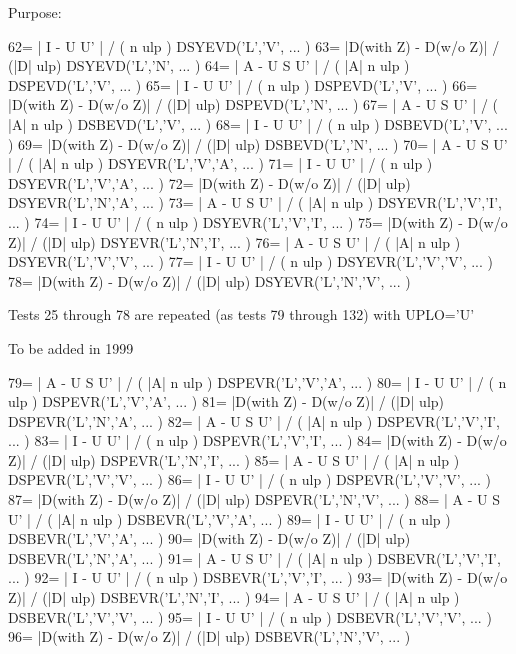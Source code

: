 \begin{DoxyParagraph}{Purpose\+: }
\begin{DoxyVerb}
    62= | I - U U' | / ( n ulp )              DSYEVD('L','V', ... )
    63= |D(with Z) - D(w/o Z)| / (|D| ulp)    DSYEVD('L','N', ... )
    64= | A - U S U' | / ( |A| n ulp )        DSPEVD('L','V', ... )
    65= | I - U U' | / ( n ulp )              DSPEVD('L','V', ... )
    66= |D(with Z) - D(w/o Z)| / (|D| ulp)    DSPEVD('L','N', ... )
    67= | A - U S U' | / ( |A| n ulp )        DSBEVD('L','V', ... )
    68= | I - U U' | / ( n ulp )              DSBEVD('L','V', ... )
    69= |D(with Z) - D(w/o Z)| / (|D| ulp)    DSBEVD('L','N', ... )
    70= | A - U S U' | / ( |A| n ulp )        DSYEVR('L','V','A', ... )
    71= | I - U U' | / ( n ulp )              DSYEVR('L','V','A', ... )
    72= |D(with Z) - D(w/o Z)| / (|D| ulp)    DSYEVR('L','N','A', ... )
    73= | A - U S U' | / ( |A| n ulp )        DSYEVR('L','V','I', ... )
    74= | I - U U' | / ( n ulp )              DSYEVR('L','V','I', ... )
    75= |D(with Z) - D(w/o Z)| / (|D| ulp)    DSYEVR('L','N','I', ... )
    76= | A - U S U' | / ( |A| n ulp )        DSYEVR('L','V','V', ... )
    77= | I - U U' | / ( n ulp )              DSYEVR('L','V','V', ... )
    78= |D(with Z) - D(w/o Z)| / (|D| ulp)    DSYEVR('L','N','V', ... )

    Tests 25 through 78 are repeated (as tests 79 through 132)
    with UPLO='U'

    To be added in 1999

    79= | A - U S U' | / ( |A| n ulp )        DSPEVR('L','V','A', ... )
    80= | I - U U' | / ( n ulp )              DSPEVR('L','V','A', ... )
    81= |D(with Z) - D(w/o Z)| / (|D| ulp)    DSPEVR('L','N','A', ... )
    82= | A - U S U' | / ( |A| n ulp )        DSPEVR('L','V','I', ... )
    83= | I - U U' | / ( n ulp )              DSPEVR('L','V','I', ... )
    84= |D(with Z) - D(w/o Z)| / (|D| ulp)    DSPEVR('L','N','I', ... )
    85= | A - U S U' | / ( |A| n ulp )        DSPEVR('L','V','V', ... )
    86= | I - U U' | / ( n ulp )              DSPEVR('L','V','V', ... )
    87= |D(with Z) - D(w/o Z)| / (|D| ulp)    DSPEVR('L','N','V', ... )
    88= | A - U S U' | / ( |A| n ulp )        DSBEVR('L','V','A', ... )
    89= | I - U U' | / ( n ulp )              DSBEVR('L','V','A', ... )
    90= |D(with Z) - D(w/o Z)| / (|D| ulp)    DSBEVR('L','N','A', ... )
    91= | A - U S U' | / ( |A| n ulp )        DSBEVR('L','V','I', ... )
    92= | I - U U' | / ( n ulp )              DSBEVR('L','V','I', ... )
    93= |D(with Z) - D(w/o Z)| / (|D| ulp)    DSBEVR('L','N','I', ... )
    94= | A - U S U' | / ( |A| n ulp )        DSBEVR('L','V','V', ... )
    95= | I - U U' | / ( n ulp )              DSBEVR('L','V','V', ... )
    96= |D(with Z) - D(w/o Z)| / (|D| ulp)    DSBEVR('L','N','V', ... )\end{DoxyVerb}
 
\end{DoxyParagraph}
